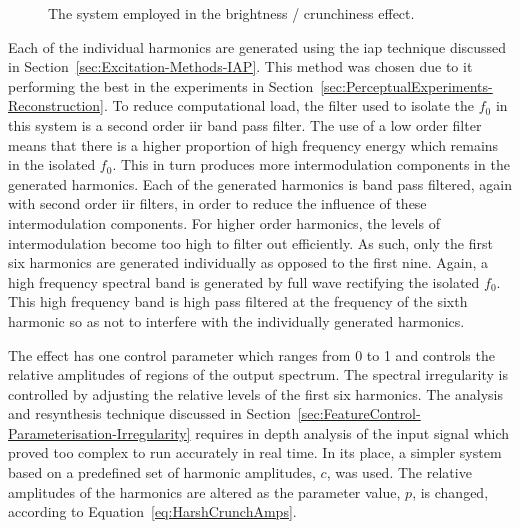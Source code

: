 \begin{figure}[h!]
				\caption{The system employed in the brightness / crunchiness effect.}
				\label{fig:HarshCrunch}
			\end{figure}

			Each of the individual harmonics are generated using the \acrshort{iap} technique discussed in
			Section~\ref{sec:Excitation-Methods-IAP}. This method was chosen due to it performing the best in
			the experiments in Section~\ref{sec:PerceptualExperiments-Reconstruction}. To reduce computational
			load, the filter used to isolate the $f_{0}$ in this system is a second order \acrshort{iir} band
			pass filter.  The use of a low order filter means that there is a higher proportion of high
			frequency energy which remains in the isolated $f_{0}$. This in turn produces more intermodulation
			components in the generated harmonics. Each of the generated harmonics is band pass filtered, again
			with second order \acrshort{iir} filters, in order to reduce the influence of these intermodulation
			components. For higher order harmonics, the levels of intermodulation become too high to filter out
			efficiently. As such, only the first six harmonics are generated individually as opposed to the
			first nine. Again, a high frequency spectral band is generated by full wave rectifying the isolated
			$f_{0}$. This high frequency band is high pass filtered at the frequency of the sixth harmonic so
			as not to interfere with the individually generated harmonics.

			The effect has one control parameter which ranges from 0 to 1 and controls the relative amplitudes
			of regions of the output spectrum. The spectral irregularity is controlled by adjusting the
			relative levels of the first six harmonics. The analysis and resynthesis technique discussed in
			Section~\ref{sec:FeatureControl-Parameterisation-Irregularity} requires in depth analysis of the
			input signal which proved too complex to run accurately in real time. In its place, a simpler
			system based on a predefined set of harmonic amplitudes, $c$, was used. The relative amplitudes of
			the harmonics are altered as the parameter value, $p$, is changed, according to
			Equation~\ref{eq:HarshCrunchAmps}.


